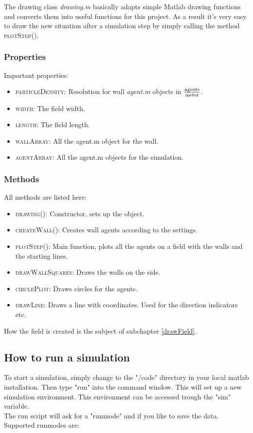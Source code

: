 \noi The drawing class \textit{drawing.m} basically adapts simple Matlab drawing functions and converts them into useful functions for this project. As a result it's very easy to draw the new situation after a simulation step by simply calling the method \textsc{plotStep()}.
\subsubsection{Properties}
Important properties:
\begin{itemize}
\item \textsc{particleDensity}: Resolution for wall \textit{agent.m} objects in $\frac{\text{agents}}{\text{meter}}$.
\item \textsc{width}: The field width.
\item \textsc{length}: The field length.
\item \textsc{wallArray}: All the agent.m object for the wall.
\item \textsc{agentArray}: All the agent.m objects for the simulation.
\end{itemize}
\subsubsection{Methods}
All methods are listed here:
\begin{itemize}
\item \textsc{drawing()}: Constructor, sets up the object.
\item \textsc{createWall()}: Creates wall agents according to the settings.
\item \textsc{plotStep()}: Main function, plots all the agents on a field with the walls and the starting lines. 
\item \textsc{drawWallSquares}: Draws the walls on the side.
\item \textsc{circlePlot}: Draws circles for the agents.
\item \textsc{drawLine}: Draws a line with coordinates. Used for the direction indicators etc.
\end{itemize}
\noi How the field is created is the subject of subchapter \ref{drawField}.


\subsection{How to run a simulation}
To start a simulation, simply change to the "/code" directory in your local matlab installation. Then type "run" into the command window. This will set up a new simulation environment. This environment can be accessed trough the "sim" variable.\\
The run script will ask for a "runmode" and if you like to save the data. Supported runmodes are:\\

